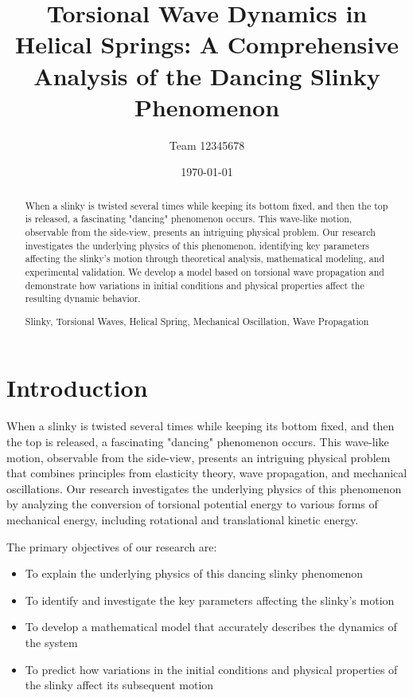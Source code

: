 \documentclass{mcmthesis}  %
\title{Torsional Wave Dynamics in Helical Springs: A Comprehensive Analysis of the Dancing Slinky Phenomenon}  %
\author{\small Team 12345678}  %
\date{\today}  %
\begin{document}
\begin{abstract}  %
When a slinky is twisted several times while keeping its bottom fixed, and then the top is released, a fascinating "dancing" phenomenon occurs. This wave-like motion, observable from the side-view, presents an intriguing physical problem. Our research investigates the underlying physics of this phenomenon, identifying key parameters affecting the slinky's motion through theoretical analysis, mathematical modeling, and experimental validation. We develop a model based on torsional wave propagation and demonstrate how variations in initial conditions and physical properties affect the resulting dynamic behavior.
\begin{keywords}
Slinky, Torsional Waves, Helical Spring, Mechanical Oscillation, Wave Propagation
\end{keywords}
\end{abstract}  %
\maketitle  %

\tableofcontents  %


\newpage  %
\section{Introduction}  %

When a slinky is twisted several times while keeping its bottom fixed, and then the top is released, a fascinating "dancing" phenomenon occurs. This wave-like motion, observable from the side-view, presents an intriguing physical problem that combines principles from elasticity theory, wave propagation, and mechanical oscillations. Our research investigates the underlying physics of this phenomenon by analyzing the conversion of torsional potential energy to various forms of mechanical energy, including rotational and translational kinetic energy.

The primary objectives of our research are:
\begin{itemize}
\item To explain the underlying physics of this dancing slinky phenomenon
\item To identify and investigate the key parameters affecting the slinky's motion
\item To develop a mathematical model that accurately describes the dynamics of the system
\item To predict how variations in the initial conditions and physical properties of the slinky affect its subsequent motion
\end{itemize}
\end{document}

